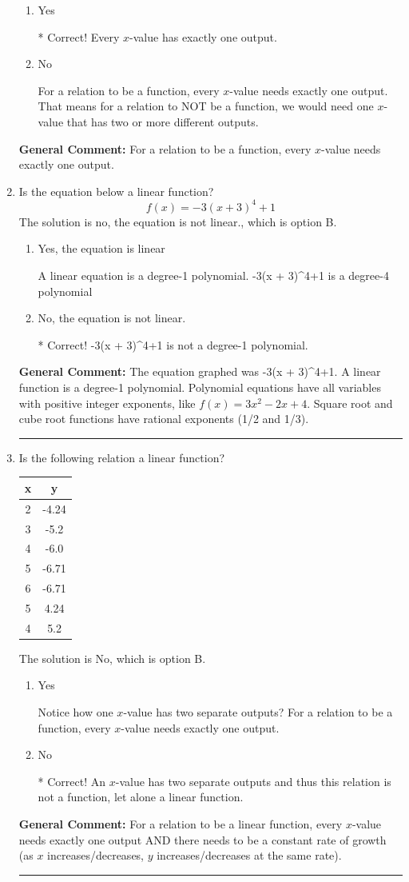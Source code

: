 \documentclass{extbook}[14pt]
\newcommand{\litem}[1]{\item #1

\rule{\textwidth}{0.4pt}}
\begin{document}
\begin{enumerate}
{\begin{enumerate}[label=\Alph*.]
\item Yes

* Correct! Every $x$-value has exactly one output.
\item No

For a relation to be a function, every $x$-value needs exactly one output. That means for a relation to NOT be a function, we would need one $x$-value that has two or more different outputs.
\end{enumerate}


\textbf{General Comment:} For a relation to be a function, every $x$-value needs exactly one output.
}
\litem{
Is the equation below a linear function?
\[ f(x) = -3(x + 3)^4+1 \]The solution is no, the equation is not linear., which is option B.

\begin{enumerate}[label=\Alph*.]
\item Yes, the equation is linear

A linear equation is a degree-1 polynomial. -3(x + 3)^4+1 is a degree-4 polynomial
\item No, the equation is not linear.

* Correct! -3(x + 3)^4+1 is not a degree-1 polynomial.
\end{enumerate}


\textbf{General Comment:} The equation graphed was -3(x + 3)^4+1. A linear function is a degree-1 polynomial. Polynomial equations have all variables with positive integer exponents, like $f(x) = 3x^2-2x+4$. Square root and cube root functions have rational exponents (1/2 and 1/3).
}
\litem{
Is the following relation a linear function?


\begin{tabular}{c|c}
x &y\tabularnewline \hline
2 &-4.24\tabularnewline \hline
3 &-5.2\tabularnewline \hline
4 &-6.0\tabularnewline \hline
5 &-6.71\tabularnewline \hline
6 &-6.71\tabularnewline \hline
5 &4.24\tabularnewline \hline
4 &5.2\end{tabular}The solution is No, which is option B.

\begin{enumerate}[label=\Alph*.]
\item Yes

Notice how one $x$-value has two separate outputs? For a relation to be a function, every $x$-value needs exactly one output.
\item No

* Correct! An $x$-value has two separate outputs and thus this relation is not a function, let alone a linear function.
\end{enumerate}


\textbf{General Comment:} For a relation to be a linear function, every $x$-value needs exactly one output AND there needs to be a constant rate of growth (as $x$ increases/decreases, $y$ increases/decreases at the same rate).
}
\end{enumerate}
\end{document}
